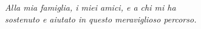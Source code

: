 \clearpage
{}
\begin{center}
  \begin{flushright}
    \begin{minipage}{.5\textwidth}
      \textit{Alla mia famiglia, i miei amici, e a chi mi ha\\ sostenuto e aiutato
      in questo meraviglioso percorso.}
    \end{minipage}
  \end{flushright}
\end{center}
\clearpage